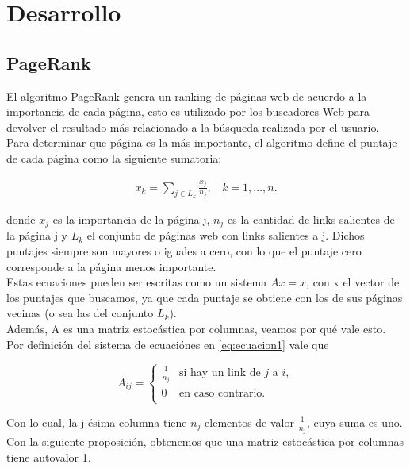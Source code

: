 \section{Desarrollo}

\subsection{PageRank}

El algoritmo PageRank genera un ranking de páginas web de acuerdo a la importancia de cada página, esto es utilizado por los buscadores Web para devolver el resultado más relacionado a la búsqueda realizada por el usuario.\\

Para determinar que página es la más importante, el algoritmo define el puntaje de cada página como la siguiente sumatoria:

\begin{eqnarray}
x_k = \sum_{j \in L_k} \frac{x_j}{n_j},~~~~k = 1,\dots,n.\label{eq:ecuacion1}
\end{eqnarray}

donde $x_{j}$ es la importancia de la página j, $n_{j}$ es la cantidad de links salientes de la página j y $L_{k}$ el conjunto de páginas web con links salientes a j. Dichos puntajes siempre son mayores o iguales a cero, con lo que el puntaje cero corresponde a la página menos importante.\\


Estas ecuaciones pueden ser escritas como un sistema $Ax = x$, con x el vector de los puntajes que buscamos, ya que cada puntaje se obtiene con los de sus páginas vecinas (o sea las del conjunto $L_{k}$).\\

Además, A es una matriz estocástica por columnas, veamos por qué vale esto. Por definición del sistema de ecuaciónes en \ref{eq:ecuacion1} vale que

\begin{equation*}
A_{ij} = \left\{
	\begin{array}{cl}
	\frac{1}{n_{j}} & \text{si hay un link de } j \text{ a } i,\\
	0 & \text{en caso contrario.}\\
	\end{array} \right.
\end{equation*}

Con lo cual, la j-ésima columna tiene $n_{j}$ elementos de valor $\frac{1}{n_{j}}$, cuya suma es uno. Con la siguiente proposición, obtenemos que una matriz estocástica por columnas tiene autovalor 1.\\

